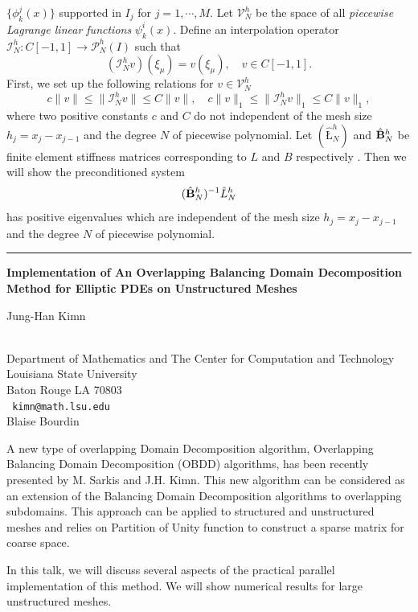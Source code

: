\documentclass[twosided]{report}
\def\BB{\bf{B}}
\def\CP{\mathcal{P}}
\def\CV{\mathcal{V}}
\def\CI{\mathcal{I}}
\begin{document}
$\{\phi^j_k(x)\}$ supported in $I_j$ for $ j=1, \cdots, M.$
Let ${\CV}_N^h$ be the space of all {\it piecewise Lagrange linear
functions} $\psi^i_k(x)$.  Define an interpolation operator
$\CI^h_N: C[-1, 1]\rightarrow \CP^h_N(I)$ such that
\begin{equation*}\label{int:INh}
  ( \CI_N^h v)(\xi_\mu) = v(\xi_\mu), \quad v\in C[-1, 1].
\end{equation*}
First, we set up  the following relations for $v\in {\CV}_N^h$
$$ c \|v\| \leq \| \CI_N^h v\| \leq C \|v\|, \quad
c \|v\|_1 \leq \| \CI_N^h v\|_1 \leq C \|v\|_1,$$
where two positive constants $c$ and $C$ do not independent of the
mesh size $h_j=x_j-x_{j-1}$ and the degree  $N$ of piecewise
polynomial. Let $(\hat{\mbox{\L}}_N^h)$ and $\hat{\BB}_N^h$ be   finite
element stiffness matrices corresponding to $L$ and $B$
respectively . Then  we will show the preconditioned system
$$ (\hat{\BB}_N^h)^{-1} \hat{L}_N^h$$
has positive  eigenvalues which are independent of the mesh size
$h_j=x_j-x_{j-1}$ and the degree $N$ of piecewise polynomial.


\begin{center}

\rule{6in}{1pt}
\end{center}

\begin{center}
{\large			\label{kimn}
{\bf
Implementation of An Overlapping Balancing Domain Decomposition Method
for Elliptic PDEs on Unstructured Meshes
}

Jung-Han Kimn} \\
Department of Mathematics and
The Center for Computation and Technology
\\
Louisiana State University
\\
Baton Rouge LA 70803
\\ {\tt
kimn@math.lsu.edu
}
\\
Blaise Bourdin
\end{center}

A new type of overlapping Domain Decomposition algorithm, Overlapping
Balancing Domain Decomposition (OBDD) algorithms, has been recently
presented by M. Sarkis and J.H. Kimn. This new algorithm can be
considered as an extension of the Balancing Domain Decomposition
algorithms to overlapping subdomains. This approach can be applied to
structured and unstructured meshes and relies on Partition of Unity
function to construct a sparse matrix for coarse space.

In this talk, we will discuss several aspects of the practical parallel
implementation of this method. We will show numerical results for large
unstructured meshes.
\end{document}
